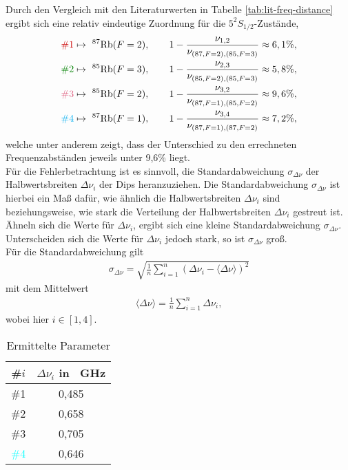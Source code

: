 Durch den Vergleich mit den Literaturwerten in Tabelle \ref{tab:lit-freq-distance} ergibt sich eine relativ eindeutige Zuordnung für die $5^{2}S_{1/2}$-Zustände, 
\begin{align*}
    \textcolor{red!80!black}{\#1} &\mapsto \ ^{87}\text{Rb}(F = 2), \qquad 1 - \frac{\nu_{1,2}}{\nu_{(87, F = 2),(85, F = 3)}} \approx 6,1 \%,  \\ \textcolor{green!50!black}{\#2} &\mapsto \ ^{85}\text{Rb}(F = 3), \qquad 1 - \frac{\nu_{2,3}}{\nu_{(85, F = 2),(85, F = 3)}} \approx 5,8 \%, \\
    \textcolor{pink!50!purple}{\#3} &\mapsto \ ^{85}\text{Rb}(F = 2), \qquad 1 - \frac{\nu_{3,2}}{\nu_{(87, F = 1),(85, F = 2)}} \approx 9,6 \%, \\
    \textcolor{cyan}{\#4} &\mapsto \ ^{87}\text{Rb}(F = 1), \qquad 1 - \frac{\nu_{3,4}}{\nu_{(87, F = 1),(87, F = 2)}} \approx 7,2 \%,
\end{align*}
welche unter anderem zeigt, dass der Unterschied zu den errechneten Frequenzabständen jeweils unter 9,6\% liegt. \\

\noindent Für die Fehlerbetrachtung ist es sinnvoll, die Standardabweichung $\sigma_{\Delta \nu}$ der Halbwertsbreiten $\Delta \nu_{i}$ der Dips heranzuziehen. Die Standardabweichung $\sigma_{\Delta \nu}$ ist hierbei ein Maß dafür, wie ähnlich die Halbwertsbreiten $\Delta \nu_{i}$ sind beziehungsweise, wie stark die Verteilung der Halbwertsbreiten $\Delta \nu_{i}$ gestreut ist. Ähneln sich die Werte für $\Delta \nu_{i}$, ergibt sich eine kleine Standardabweichung $\sigma_{\Delta \nu}$. Unterscheiden sich die Werte für $\Delta \nu_{i}$ jedoch stark, so ist $\sigma_{\Delta \nu}$ groß. \\
Für die Standardabweichung gilt 
\begin{align}
    \sigma_{\Delta \nu} = \sqrt{\frac{1}{n} \sum_{i = 1}^{n} (\Delta \nu_{i} - \langle \Delta \nu \rangle)^2} 
    \label{eq:standard-dev}
\end{align}
mit dem Mittelwert 
\begin{align}
    \langle \Delta \nu \rangle = \frac{1}{n} \sum_{i = 1}^{n} \Delta \nu_{i},
    \label{eq:mean}
\end{align}
wobei hier $i \in [1,4]$.

\begin{table}[!h]
    \centering
    \begin{tabular}{|c|c|}
        \hline 
        \#$i$ & $\Delta \nu_{i}$ in \SI{}{\giga \hertz} \\
        \hline
        \hline 
         \textcolor{red!80!black}{\#1} & 0,485 \\
        \hline 
         \textcolor{green!50!black}{\#2} & 0,658 \\
        \hline 
         \textcolor{pink!50!purple}{\#3} & 0,705 \\
        \hline
         \textcolor{cyan}{\#4} & 0,646 \\
        \hline
    \end{tabular}
    \caption{Ermittelte Parameter}
    \label{tab:delta_nu_parameter}
\end{table}

